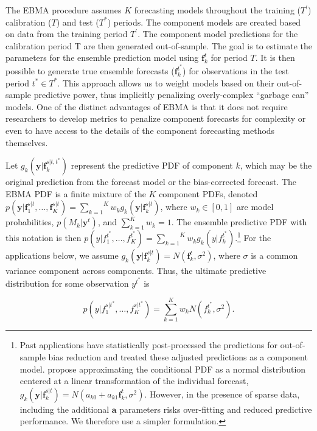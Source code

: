 \documentclass[12pt,fullpage,endnotes]{article}
\begin{document}
The EBMA procedure assumes $K$ forecasting models throughout the
training ($T^{\prime}$) calibration ($T$) and test ($T^\ast$)
periods. The component models are created based on data from the
training period $T^\prime$. The component model predictions for the
calibration period T are then generated out-of-sample. The goal is to
estimate the parameters for the ensemble prediction model using
$\mathbf{f}^{t}_k$ for period $T$.  It is then possible to generate
true ensemble forecasts ($\mathbf{f}_k^{t^\ast}$) for observations in
the test period $t^\ast \in T^*$.  This approach allows us to weight
models based on their out-of-sample predictive power, thus implicitly
penalizing overly-complex ``garbage can'' models.  One of the distinct
advantages of EBMA is that it does not require researchers to develop
metrics to penalize component forecasts for complexity or even to have
access to the details of the component forecasting methods themselves.

Let $g_k(\mathbf{y}|\mathbf{f}_k^{s|t, t^\ast})$ represent the
predictive PDF of component $k$, which may be the original prediction
from the forecast model or the bias-corrected forecast.  The EBMA PDF
is a finite mixture of the $K$ component PDFs, denoted
$p(\mathbf{y}|\mathbf{f}_1^{s|t}, \ldots,
\mathbf{f}_K^{s|t})=\overset{K}{\underset{k=1}{\sum}} w_k
g_k(\mathbf{y}|\mathbf{f}_k^{s|t})$, where $w_k \in [0,1]$ are model
probabilities, $p(M_k|\mathbf{y}^t)$, and $\sum_{k=1}^Kw_k=1$. The
ensemble predictive PDF with this notation is then
$p(y|f_{1}^{t^\ast}, \ldots,
f_{K}^{t^\ast})=\overset{K}{\underset{k=1}{\sum}} w_k
g_k(y|f_{k}^{t^*})$.\footnote{Past applications have statistically
  post-processed the predictions for out-of-sample bias reduction and
  treated these adjusted predictions as a component
  model. \citet{Raftery:2005} propose approximating the conditional
  PDF as a normal distribution centered at a linear transformation of
  the individual forecast, $g_k(\mathbf{y}|\mathbf{f}_k^{s|t}) =
  N(a_{k0} + a_{k1}\mathbf{f}_k^{t}, \sigma^2)$. However, in the
  presence of sparse data, including the additional $\mathbf{a}$
  parameters risks over-fitting and reduced predictive performance.
  We therefore use a simpler formulation.}
For the applications below, we assume
$g_k(\mathbf{y}|\mathbf{f}_k^{s|t}) = N(\mathbf{f}_k^{t}, \sigma^2)$,
where $\sigma$ is a common variance component across components.
Thus, the ultimate predictive distribution for some observation
$y^{t^\ast}$ is

\begin{equation}
\label{pdf}p(y|f_1^{s|t^\ast},
\ldots, f_K^{s|t^\ast}) = \overset{K}{\underset{k=1}{\sum}} w_k
N(f_k^{t^\ast}, \sigma^2).
\end{equation}
\end{document}
